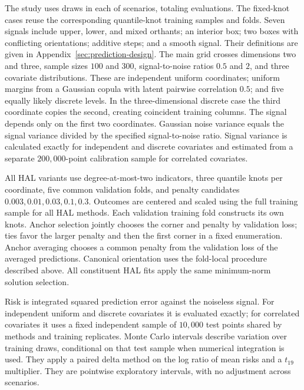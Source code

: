 \documentclass[11pt]{article}
\theoremstyle{definition}
\theoremstyle{remark}
\begin{document}
The study uses \PilotReplicates{} draws in each of \PilotScenarios{}
scenarios, totaling \PilotCases{} evaluations. The fixed-knot cases reuse
the corresponding quantile-knot training samples and folds. Seven signals include
upper, lower, and mixed orthants; an interior box; two boxes with conflicting
orientations; additive steps; and a smooth signal. Their definitions are
given in Appendix~\ref{sec:prediction-design}. The main grid crosses
dimensions two and three, sample sizes $100$ and $300$, signal-to-noise
ratios $0.5$ and $2$, and three covariate distributions. These are independent
uniform coordinates; uniform margins from a Gaussian copula with latent
pairwise correlation $0.5$; and five equally likely discrete levels. In the
three-dimensional discrete case the third coordinate copies the second,
creating coincident training columns. The signal depends only on the first
two coordinates. Gaussian noise variance equals the signal variance divided
by the specified signal-to-noise ratio.
Signal variance is calculated exactly for independent and discrete
covariates and estimated from a separate $200{,}000$-point calibration
sample for correlated covariates.

All HAL variants use degree-at-most-two indicators, three quantile knots
per coordinate, five common validation folds, and penalty candidates
$0.003,0.01,0.03,0.1,0.3$. Outcomes are centered and scaled using the full
training sample for all HAL methods. Each validation training fold constructs
its own knots. Anchor selection jointly chooses the corner and penalty by
validation loss; ties favor the larger penalty and then the first corner
in a fixed enumeration. Anchor averaging chooses a common penalty from
the validation loss of the averaged predictions. Canonical orientation
uses the fold-local procedure described above. All constituent HAL fits
apply the same minimum-norm solution selection.

Risk is integrated squared prediction error against the noiseless signal.
For independent uniform and discrete covariates it is evaluated exactly;
for correlated covariates it uses a fixed independent sample of $10{,}000$
test points shared by methods and training replicates. Monte Carlo
intervals describe variation over training draws, conditional on that test
sample when numerical integration is used. They apply a paired delta method
on the log ratio of mean risks and a $t_{19}$ multiplier. They are
pointwise exploratory intervals, with no adjustment across scenarios.
\end{document}
